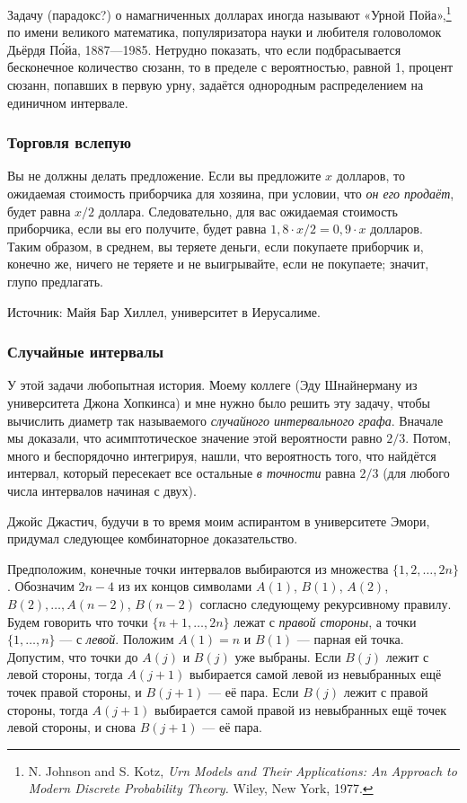 Задачу (парадокс?) о намагниченных долларах иногда называют «Урной Пойа»,\footnote{N. Johnson and S. Kotz, \emph{Urn Models and Their Applications: An Approach to Modern Discrete Probability Theory.} Wiley, New York, 1977.} по имени великого математика, популяризатора науки и любителя головоломок Дьёрдя П\'{о}йа, 1887---1985.
Нетрудно показать, что если подбрасывается бесконечное количество сюзанн, то в пределе с вероятностью, равной 1, процент сюзанн, попавших в первую урну, задаётся однородным распределением на единичном интервале.

\subsubsection*{Торговля вслепую}%

Вы не должны делать предложение.
Если вы предложите $x$ долларов, то ожидаемая стоимость приборчика для хозяина, при условии, что \emph{он его продаёт}, будет равна $x/2$ доллара.
Следовательно, для вас ожидаемая стоимость приборчика, если вы его получите, будет равна $1{,}8 {\cdot} x/2=0{,}9{\cdot}x$ долларов.
Таким образом, в среднем, вы теряете деньги, если покупаете приборчик и, конечно же, ничего не теряете и не выигрывайте, если не покупаете;
значит, глупо предлагать.
\heart

Источник: Майя Бар Хиллел, университет в Иерусалиме.

\subsubsection*{Случайные интервалы}%

У этой задачи любопытная история.
Моему коллеге (Эду Шнайнерману из университета Джона Хопкинса) и мне нужно было решить эту задачу, чтобы вычислить диаметр так называемого \emph{случайного интервального графа}. 
Вначале мы доказали, что асимптотическое значение этой вероятности равно $2/3$.
Потом, много и беспорядочно интегрируя, нашли, что вероятность того, что найдётся интервал, который пересекает все остальные \emph{в точности} равна $2/3$ (для любого числа интервалов начиная с двух).

Джойс Джастич, %
будучи в то время моим аспирантом в университете Эмори, придумал следующее комбинаторное доказательство.

\medskip

Предположим, конечные точки интервалов выбираются из множества $\{1,2,\dots,2n\}$.
Обозначим $2n-4$ из их концов символами $A(1)$, $B(1)$, $A(2)$, $B(2),\dots, A(n-2)$, $B(n-2)$ согласно следующему рекурсивному правилу.
Будем говорить что точки $\{n+1, \dots , 2n\}$ лежат с \emph{правой стороны}, а точки $\{1, \dots , n\}$ --- с \emph{левой}.
Положим $A(1)=n$ и $B(1)$ --- парная ей точка.
Допустим, что точки до $A(j)$ и $B(j)$ уже выбраны. 
Если $B(j)$ лежит с левой стороны, тогда $A(j+1)$ выбирается самой левой из невыбранных ещё точек правой стороны, и $B(j+1)$ --- её пара.
Если $B(j)$ лежит с правой стороны, тогда $A(j+1)$ выбирается самой правой из невыбранных ещё точек левой стороны, и снова $B(j+1)$ --- её пара.

